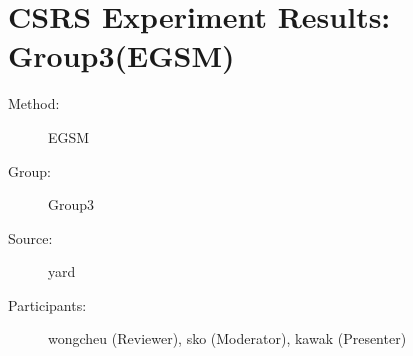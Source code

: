 	  
\chapter {CSRS Experiment Results: Group3(EGSM)}
\small

\begin{description}
\item [Method:] EGSM
\item [Group:] Group3
\item [Source:] yard
\item [Participants:] wongcheu (Reviewer), sko (Moderator), kawak (Presenter)
\end{description}
